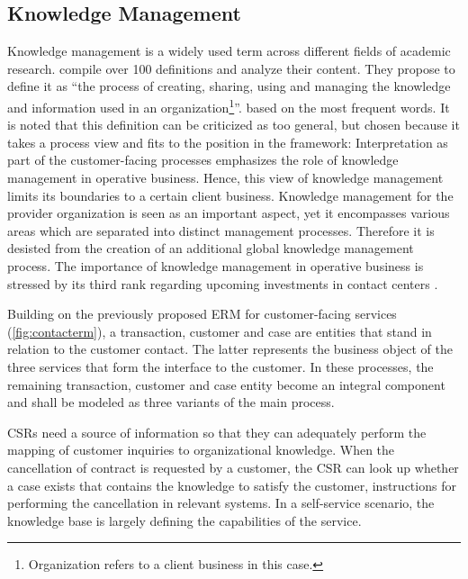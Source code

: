 	 
	 
	 
	 \subsection{Knowledge Management}
	 

Knowledge management is a widely used term across different fields of academic research. \cite{girard2015defining} compile over 100 definitions and analyze their content. They propose to define it as \enquote{the process of creating, sharing, using and managing the knowledge and information used in an organization\footnote{Organization refers to a client business in this case.}}. \citep[]{girard2015defining} based on the most frequent words. It is noted that this definition can be criticized as too general, but chosen because it takes a process view and fits to the position in the framework: Interpretation as part of the customer-facing processes emphasizes the role of knowledge management in operative business. Hence, this view of knowledge management limits its boundaries to a certain client business. Knowledge management for the provider organization is seen as an important aspect, yet it encompasses various areas which are separated into distinct management processes. Therefore it is desisted from the creation of an additional global knowledge management process. The importance of knowledge management in operative business is stressed by its third rank regarding upcoming investments in contact centers \citep{ccnet2016}. 

Building on the previously proposed \acrshort{ERM} for customer-facing services (\Fig \ref{fig:contacterm}), a transaction, customer and case are entities that stand in relation to the customer contact. The latter represents the business object of the three services that form the interface to the customer. In these processes, the remaining transaction, customer and case entity become an integral component and shall be modeled as three variants of the main process. 

\acrshort{CSR}s need a source of information so that they can adequately perform the mapping of customer inquiries to organizational knowledge. When the cancellation of contract is requested by a customer, the \acrshort{CSR} can look up whether a case exists that contains the knowledge to satisfy the customer, \viz instructions for performing the cancellation in relevant systems. In a self-service scenario, the knowledge base is largely defining the capabilities of the service. 

